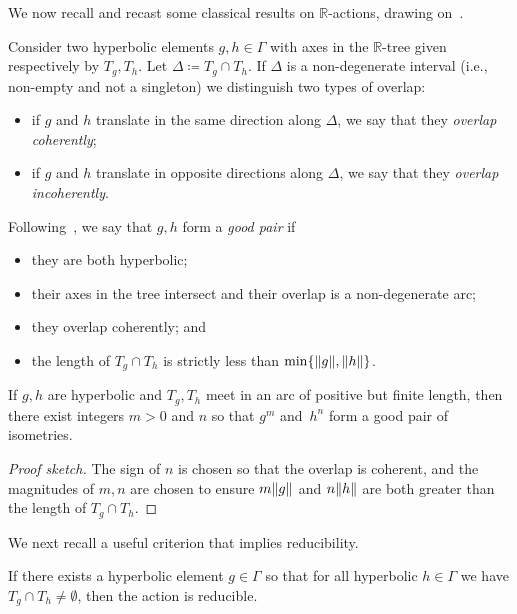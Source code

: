 We now recall and recast some classical results on $\mathbb{R}$-actions, drawing on~\cite{CM87:GroupActions, Pa89:Paulin1989TheGT}.

Consider two hyperbolic elements $g, h \in \Gamma$ with axes in the $\mathbb{R}$-tree given respectively by $T_g,T_h$. Let $\Delta \coloneqq T_g \cap T_h$. If $\Delta$ is a non-degenerate interval (i.e., non-empty and not a singleton) we distinguish two types of overlap:
\begin{itemize}
\item if $g$ and $h$ translate in the same direction along $\Delta$, we say
that they \emph{overlap coherently};
\item if $g$ and $h$ translate in opposite
directions along $\Delta$, we say that they \emph{overlap incoherently}.
\end{itemize}
Following~\cite[Definition~3.2]{CM87:GroupActions}, we say that $g,h$ form a \emph{good pair} if 
\begin{itemize} 
\item they are both hyperbolic;
\item their axes in the tree intersect and their overlap is a non-degenerate arc;
\item they overlap coherently; and
\item the length of $T_g \cap T_h$ is strictly less than $\min \{ \lVert g \rVert, \lVert h \rVert \}$.
\end{itemize}

\begin{lemma}
If $g,h$ are hyperbolic and $T_g,T_h$ meet in an arc of positive but
finite length, then there exist integers $m>0$ and $n$ so that $g^m$
and~$h^n$
form a good pair of isometries.
\label{lem:powers_goodpair}
\end{lemma}

\begin{proof}[Proof sketch]
   The sign of $n$ is chosen so that the overlap is coherent, and the magnitudes of $m,n$ are chosen
to ensure $m \lVert g \rVert$ and $n \lVert h\rVert$ are both greater than the length  of $T_g \cap T_h$.
\end{proof}

We next recall a useful criterion that implies reducibility.
\begin{lemma}
    If there exists a hyperbolic element $g \in \Gamma$ so that for all hyperbolic $h \in \Gamma$ we have  $T_g \cap T_h \neq \emptyset$, then the action is reducible.
    \label{lem:CM_red_criterion}
\end{lemma}

